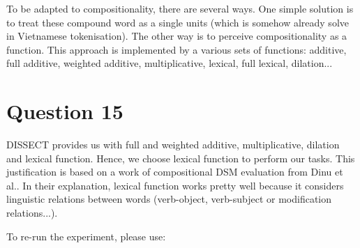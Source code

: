 \documentclass[12pt]{article}
\begin{document}
To be adapted to compositionality, there are several ways. One simple solution is to treat these compound word as a single units (which is somehow already solve in Vietnamese tokenisation). The other way is to perceive compositionality as a function. This approach is implemented by a various sets of functions: additive, full additive, weighted additive, multiplicative, lexical, full lexical, dilation...

\section{Question 15}
DISSECT provides us with full and weighted additive, multiplicative, dilation and lexical function. Hence, we choose lexical function to perform our tasks. This justification is based on a work of compositional DSM evaluation from Dinu et al.\cite{dinu2013general}. In their explanation, lexical function works pretty well because it considers linguistic relations between words (verb-object, verb-subject or modification relations...).

To re-run the experiment, please use: 
\end{document}
